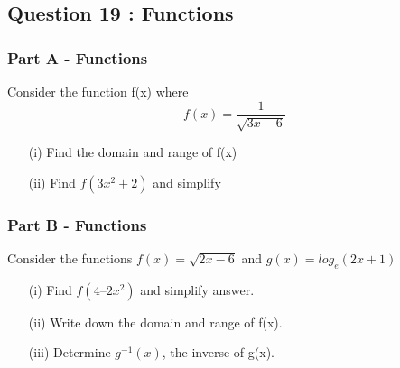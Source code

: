 \documentclass[]{article}
\begin{document}
\newpage

%
%
%
%
%	
\subsection*{Question 19 : Functions}

\subsubsection*{Part A - Functions}
Consider the function f(x) where \[ f(x) = \frac{1}{\sqrt{3x-6}} \]




\begin{itemize}
	\item[(i)] Find the domain and range of f(x)
	\item[(ii)] Find $f(3x^2 + 2)$ and simplify
\end{itemize}


\subsubsection*{Part B - Functions}
Consider the functions $f(x) = \sqrt{2x-6}$ and  $g(x) = log_e(2x + 1)$

\begin{itemize}
	\item[(i)]Find $f(4 – 2x^2)$ and simplify answer.
		\item[(ii)] Write down the domain and range of f(x).
		\item[(iii)] Determine $g^{-1}(x)$, the inverse of g(x).
\end{itemize}
\end{document}
